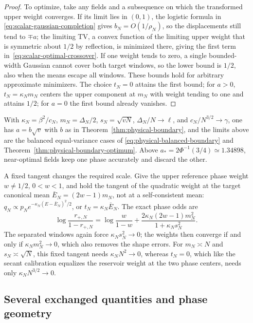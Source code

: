 \begin{proof}
To optimize, take any fields and a subsequence on which the
transformed upper weight converges. If its limit lies in $(0,1)$,
the logistic formula in \eqref{eq:scalar-gaussian-completion} gives
$b_N=O(1/\rho_N)$, so the displacements still tend to $\mp a$; the
limiting TV, a convex function of the limiting upper weight that is
symmetric about $1/2$ by reflection, is minimized there, giving the
first term in~\eqref{eq:scalar-optimal-crossover}. If one weight
tends to zero, a single bounded-width Gaussian cannot cover both
target windows, so the lower bound is $1/2$, also when the means
escape all windows. These bounds hold for arbitrary approximate
minimizers. The choice $t_N=0$ attains the first bound; for $a>0$,
$t_N=\kappa_Nm_N$ centers the upper component at $m_N$ with
weight tending to one and attains $1/2$; for $a=0$ the first bound
already vanishes.
\end{proof}

With $\kappa_N=\beta^2/c_N$, $m_N=\Delta_N/2$, $s_N=\sqrt{vN}$,
$\Delta_N/N\to\ell$, and $c_N/N^{3/2}\to\gamma$, one has $a=b\sqrt v$
with $b$ as in Theorem~\ref{thm:physical-boundary}, and the limits
above are the balanced equal-variance cases of
\eqref{eq:physical-balanced-boundary} and
Theorem~\ref{thm:physical-boundary-optimum}. Above
$a_*=2\Phi^{-1}(3/4)\simeq1.34898$, near-optimal fields keep one
phase accurately and discard the other.

A fixed tangent changes the required scale. Give the upper
reference phase weight $w\ne1/2$, $0<w<1$, and hold the tangent of
the quadratic weight at the target canonical mean
$\bar E_N=(2w-1)m_N$, not at a self-consistent mean:
$q_N\propto p_Ne^{-\kappa_N(E-\bar E_N)^2/2}$, or
$t_N=\kappa_N\bar E_N$. The exact phase odds are
\begin{equation}
 \log\frac{r_{+,N}}{1-r_{+,N}}
 =\log\frac w{1-w}
   +\frac{2\kappa_N(2w-1)m_N^2}{1+\kappa_Ns_N^2}.
 \label{eq:gaussian-untuned-odds}
\end{equation}
The separated windows again force $\kappa_Ns_N^2\to0$; the weights
then converge if and only if $\kappa_Nm_N^2\to0$, which also removes
the shape errors. For $m_N\asymp N$ and $s_N\asymp\sqrt N$, this
fixed tangent needs $\kappa_NN^2\to0$, whereas
$t_N=0$, which like the secant calibration equalizes the reservoir
weight at the two phase centers, needs only $\kappa_NN^{3/2}\to0$.

\subsection{Several exchanged quantities and phase geometry}

